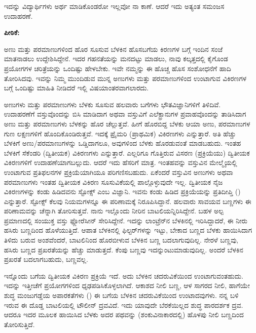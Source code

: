 ಇದನ್ನು ವಿದ್ಯಾರ್ಥಿಗಳು ಅರ್ಥ ಮಾಡಿಕೊಂಡರೋ ಇಲ್ಲವೋ ನಾ ಕಾಣೆ. ಆದರೆ ಇದು ಅತ್ಯಂತ ಸಮಂಜಸ ಉದಾಹರಣೆ.



\noindent
\textbf{ಪೀಠಿಕೆ:}

ಅಣು ಮತ್ತು ಪರಮಾಣುಗಳಿಂದ ಹೊರ ಸೂಸುವ ಬೆಳಕಿನ ಹೊಸಬಗೆಯ ಕಿರಣಗಳ ಬಗ್ಗೆ ಇಂದಿನ ಸಂಜೆ ಮಾತನಾಡಲು ಉದ್ದೇಶಿಸಿದ್ದೇನೆ. ಇದರ ಗಹನತೆಯನ್ನು ಮನದಟ್ಟು ಮಾಡಲು, ನಾವು ಕಲ್ಕತ್ತದಲ್ಲಿ ಕೈಗೊಂಡ ಪ್ರಯೋಗಗಳ ಚರಿತ್ರೆಯನ್ನು ಒಂದಿಷ್ಟು ಹೇಳಬೇಕು. ಇವೇ ನಮ್ಮನ್ನು ಈ ಹೊಚ್ಚ ಹೊಸ ಸಂಶೋಧನೆಗೆ ಹಾದಿ ತೋರಿಸಿದವು. ಇವನ್ನು ನಿಮ್ಮ ಮುಂದಿಡುವ ಮುನ್ನ ಅಣುಗಳು ಮತ್ತು ಪರಮಾಣುಗಳಿಂದ ಉಂಟಾಗುವ ವಿಕಿರಣಗಳ ಬಗ್ಗೆ ಒಂದಿಷ್ಟು ಮಾಹಿತಿ ನೀಡಿದರೆ ಇಲ್ಲಿ ವಿಷಯಾಂತರವಾಗಲಾರದು.

ಅಣುಗಳು ಮತ್ತು ಪರಮಾಣುಗಳು ಬೆಳಕು ಸೂಸುವ ಹಲವಾರು ಬಗೆಗಳು ಭೌತವಿಜ್ಞಾನಿಗಳಿಗೆ ತಿಳಿದಿವೆ. ಉದಾಹರಣೆಗೆ ವಸ್ತುವೊಂದನ್ನು ಬಿಸಿ ಮಾಡಿದಾಗ ಅಥವಾ ವಸ್ತುವಿಗೆ ಎಲೆಕ್ಟ್ರಾನುಗಳ ಪ್ರವಾಹವೊಂದನ್ನು ತಾಡಿಸಿದಾಗ ಅಣು ಮತ್ತು ಪರಮಾಣುಗಳು ಬೆಳಕನ್ನು ಹೊರ ಚೆಲ್ಲುತ್ತವೆ. ಹೀಗೆ ಹೊರಬಿದ್ದ ಬೆಳಕು ಆಯಾ ಅಣು, ಪರಮಾಣುಗಳ ಗುಣ ಲಕ್ಷಣಗಳಿಗೆ ಹೊಂದಿಕೊಂಡಿರುತ್ತವೆ. ಇದಕ್ಕೆ ಪ್ರೈಮರಿ (ಪ್ರಾಥಮಿಕ) ವಿಕಿರಣಗಳು ಎನ್ನುತ್ತಾರೆ. ಅತಿ ಹೆಚ್ಚು ಬೆಳಕಿಗೆ ಅಣು/ಪರಮಾಣುಗಳನ್ನು ಒಡ್ಡಿದಾಗಲೂ, ಅವುಗಳಿಂದ ಬೆಳಕು ಹೊರಡುವಂತೆ ಮಾಡಬಹುದು. ಇಂತಹ ಬೆಳಕಿಗೆ ಸೆಕೆಂಡರಿ (ದ್ವಿತೀಯಕ) ವಿಕಿರಣಗಳು ಎನ್ನುತ್ತಾರೆ. ಎಲ್ಲರಿಗೂ ಗೊತ್ತಿರುವ ವಿಸರಣ (ಪ್ರಕ್ರಿಯೆಯು) ದ್ವಿತೀಯಕ ವಿಕಿರಣಗಳಿಗೆ ಉದಾಹಣೆಯಾಗಬಲ್ಲುದು. ಆದರೆ ಇದು ಹೆಸರಿಗೆ ಮಾತ್ರ. ಇಂತಹವನ್ನು ವಸ್ತುವಿನ ಮೇಲ್ಮೈಯಲ್ಲಿ ಉಂಟಾಗುವ ಪ್ರತಿಫಲನಗಳ ಪ್ರಕ್ರಿಯೆಯಾಗಿಯೂ ಪರಿಗಣಿಸಬಹುದು. ಏಕೆಂದರೆ ವಸ್ತುವಿನ ಅಣುಗಳು ಅಥವಾ ಪರಮಾಣುಗಳು ಇಂತಹ ದ್ವಿತೀಯಕ ವಿಕಿರಣ ಸೂಸುವಿಕೆಯಲ್ಲಿ ಪಾಲ್ಗೊಳ್ಳುವುದೇ ಇಲ್ಲ. ದ್ವಿತೀಯಕ ನೈಜ ವಿಕಿರಣಗಳನ್ನು ಕಂಡು ಹಿಡಿದವನು ಸ್ಟೋಕ್ಸ್ ಎಂಬ ವಿಜ್ಞಾನಿ. ಇವನು ಕಂಡು ಹಿಡಿದ ಪ್ರಕ್ರಿಯೆಯನ್ನು ಪ್ರತಿದೀಪ್ತಿ () ಎನ್ನುತ್ತಾರೆ. ಸ್ಟೋಕ್ಸ್ ಕೆಲವು ನಿಯಮಗಳನ್ನೂ ಈ ಪರಿಣಾಮಕ್ಕೆ ನಿರೂಪಿಸಿದ್ದಾನೆ. ಹಲವಾರು ಸಾವಯವ ಬಣ್ಣಗಳು ಈ ಪರಿಣಾಮವನ್ನು ಚೆನ್ನಾಗಿ ತೋರಿಸುತ್ತವೆ. ನಾನು ಇಲ್ಲೊಂದು ನೀರಿನ ಬಾಟಲಿಯನ್ನಿರಿಸಿದ್ದೇನೆ. ಬಹಳ ಅಲ್ಪ ಪ್ರಮಾಣದಲ್ಲಿ ಸಂಯುಕ್ತ ವಸ್ತು ಫ್ಲೋರೆಸೀನ್ ಸೇರಿಸಿದ್ದೇನೆ. ಇದನ್ನು ಲಾಂಟ್ರೆನ್‍ನ ಬೆಳಕಿನಲ್ಲಿ ಇರಿಸಿದ್ದಾದರೆ, ಈ ನೀರು ಹಸಿರು ಬಣ್ಣದಿಂದ ಹೊಳೆಯುತ್ತಿದೆ. ಆಪಾತ ಬೆಳಕಿನಲ್ಲಿ ಫಿಲ್ಟರ್‌ಗಳನ್ನು ಇಟ್ಟು, ಬೇಕಾದ ಬಣ್ಣದ ಬೆಳಕು ಹಾಯಿಸಿದಾಗ ತಿಳಿದು ಬರುವ ಅಂಶವೆಂದರೆ, ಬಾಟಲಿನಿಂದ ಹೊರಬೀಳುವ ಬೆಳಕಿನ ಬಣ್ಣ ಬದಲಾಗುವುದಿಲ್ಲ. ನೇರಳೆ ಬಣ್ಣವು, ಹಸಿರು ಬಣ್ಣದ ಪ್ರಖರತೆಯನ್ನು ಹೆಚ್ಚು ಮಾಡುತ್ತದೆ. ಕೆಂಪು ಬಣ್ಣವು ಇದನ್ನುಂಟುಮಾಡುವುದಿಲ್ಲ. ಅಂದರೆ ಬೆಳಕಿನ ಪ್ರಖರತೆ ಬದಲಾಗಬಹುದು, ಬಣ್ಣವಲ್ಲ.

ಇನ್ನೊಂದು ಬಗೆಯ ದ್ವಿತೀಯಕ ವಿಕಿರಣ ಪ್ರಕ್ರಿಯೆ ಇದೆ. ಅದು ಬೆಳಕಿನ ಚದರುವಿಕೆಯಿಂದ ಉಂಟಾಗುವಂತಹುದು. ಇದನ್ನು ಇತ್ತೀಚೆಗೆ ಪ್ರಯೋಗಗಳಿಂದ ಧೃಢಪಡಿಸಿಕೊಳ್ಳಲಾಗಿದೆ. ಆಕಾಶದ ನೀಲಿ ಬಣ್ಣ, ಆಳ ಸಾಗರದ ನೀಲಿ, ಹಾಗೆಯೇ ಶುದ್ಧ ಮಂಜುಗಡ್ಡೆಯ ಅಪಾರಕತೆಗಳು () ಈ ಬಗೆಯ ಬೆಳಕಿನ ಚದರುವಿಕೆಯಿಂದ ಉಂಟಾದವುಗಳು. ನನ್ನ ಬಳಿ ಇರುವ ಈ ದೊಡ್ಡ ಬಾಟಲಿಯಲ್ಲಿ ಟೌಲೀನ್ ದ್ರವವಿದೆ. ಇದು ಯಾವುದೇ ಬೆರಕೆಯಿಲ್ಲದ ಶುದ್ಧ ಪಾರದರ್ಶಕ ದ್ರವ. ಆದರೂ ಇದರ ಮೂಲಕ ಹಾಯಿಸಿದ ಬೆಳಕು ಅದರ ಪಥವನ್ನು (ಶಂಕುವಿನಾಕಾರದಲ್ಲಿ) ಹೊಳಪು ನೀಲಿ ಬಣ್ಣದಿಂದ ತೋರಿಸುತ್ತಿದೆ.

